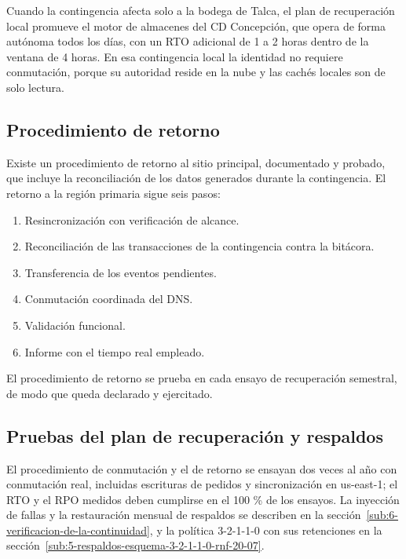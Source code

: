 Cuando la contingencia afecta solo a la bodega de Talca, el plan de recuperación local promueve el motor de almacenes del CD Concepción, que opera de forma autónoma todos los días, con un RTO adicional de 1 a 2 horas dentro de la ventana de 4 horas. En esa contingencia local la identidad no requiere conmutación, porque su autoridad reside en la nube y las cachés locales son de solo lectura.

\subsection{Procedimiento de retorno}

Existe un procedimiento de retorno al sitio principal, documentado y probado, que incluye la reconciliación de los datos generados durante la contingencia. El retorno a la región primaria sigue seis pasos:

\begin{enumerate}
  \item Resincronización con verificación de alcance.
  \item Reconciliación de las transacciones de la contingencia contra la bitácora.
  \item Transferencia de los eventos pendientes.
  \item Conmutación coordinada del DNS.
  \item Validación funcional.
  \item Informe con el tiempo real empleado.
\end{enumerate}

El procedimiento de retorno se prueba en cada ensayo de recuperación semestral, de modo que queda declarado y ejercitado.

\subsection{Pruebas del plan de recuperación y respaldos}

El procedimiento de conmutación y el de retorno se ensayan dos veces al año con conmutación real, incluidas escrituras de pedidos y sincronización en us-east-1; el RTO y el RPO medidos deben cumplirse en el 100 \% de los ensayos. La inyección de fallas y la restauración mensual de respaldos se describen en la sección~\ref{sub:6-verificacion-de-la-continuidad}, y la política 3-2-1-1-0 con sus retenciones en la sección~\ref{sub:5-respaldos-esquema-3-2-1-1-0-rnf-20-07}.

\let\thetable\LFXthetableorig
\setcounter{table}{\value{LFXtablaprevia}}
